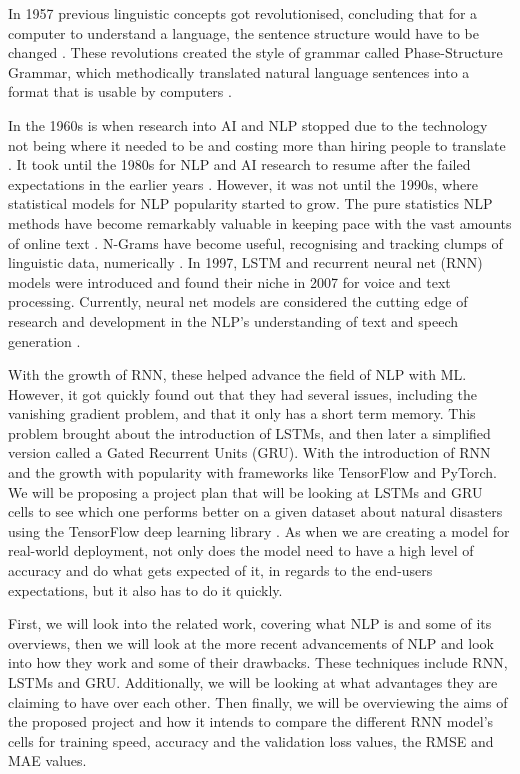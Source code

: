 \documentclass[a4paper,10pt]{article}
\begin{document}
	In 1957 previous linguistic concepts got revolutionised, concluding that for a computer to understand a language, the sentence structure would have to be changed \cite{chomsky2002syntactic}. These revolutions created the style of grammar called Phase-Structure Grammar, which methodically translated natural language sentences into a format that is usable by computers \cite{nlp_history}. 
	
	In the 1960s is when research into AI and NLP stopped due to the technology not being where it needed to be and costing more than hiring people to translate \cite{nlp_history}. It took until the 1980s for NLP and AI \cite{what_ai} research to resume after the failed expectations in the earlier years \cite{nlp_history}. However, it was not until the 1990s, where statistical models for NLP popularity started to grow. The pure statistics NLP methods have become remarkably valuable in keeping pace with the vast amounts of online text \cite{nlp_history}. N-Grams have become useful, recognising and tracking clumps of linguistic data, numerically \cite{n_grams}. In 1997, LSTM and recurrent neural net (RNN) models \cite{nlp_rnn} were introduced and found their niche in 2007 for voice and text processing. Currently, neural net models are considered the cutting edge of research and development in the NLP's understanding of text and speech generation \cite{nlp_history}.
	
	With the growth of RNN, these helped advance the field of NLP with ML. However, it got quickly found out that they had several issues, including the vanishing gradient problem, and that it only has a short term memory. This problem brought about the introduction of LSTMs, and then later a simplified version called a Gated Recurrent Units (GRU). With the introduction of RNN and the growth with popularity with frameworks like TensorFlow and PyTorch. We will be proposing a project plan that will be looking at LSTMs and GRU cells to see which one performs better on a given dataset about natural disasters \cite{disater_kaggle} using the TensorFlow deep learning library \cite{tensorflow}. As when we are creating a model for real-world deployment, not only does the model need to have a high level of accuracy and do what gets expected of it, in regards to the end-users expectations, but it also has to do it quickly.
	
	First, we will look into the related work, covering what NLP is and some of its overviews, then we will look at the more recent advancements of NLP and look into how they work and some of their drawbacks. These techniques include RNN, LSTMs and GRU. Additionally, we will be looking at what advantages they are claiming to have over each other. Then finally, we will be overviewing the aims of the proposed project and how it intends to compare the different RNN model's cells for training speed, accuracy and the validation loss values, the RMSE and MAE values.
	
\end{document}
